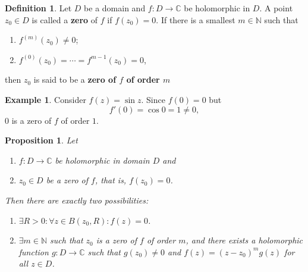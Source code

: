 \documentclass[12pt,openany]{book}
\newtheorem{proposition}[theorem]{Proposition}
\theoremstyle{definition}
\newtheorem{definition}{Definition}[chapter]
\newtheorem{example}{Example}[section]
\newcommand{\N}{\mathbb{N}}
\newcommand{\C}{\mathbb{C}}
\begin{document}
	\vspace{8pt}
	\begin{tcolorbox}[colback=white,colframe=defcolor,arc=5pt,title={\color{white}\bf Zero}]
		\begin{definition}
			Let $D$ be a domain and $f:D\to\C$ be holomorphic in $D$. A point $z_0\in D$ is called a \textbf{zero} of $f$ if $f(z_0)=0$. If there is a smallest $m\in\N$ such that \begin{enumerate}[(1)]
				\item $f^{(m)}(z_0)\neq 0$;
				\item $f^{(0)}(z_0)=\cdots=f^{m-1}(z_0)=0$,
			\end{enumerate} then $z_0$ is said to be a \textbf{zero of $f$ of order $m$}
		\end{definition}
	\end{tcolorbox}
	\begin{example}
		Consider $f(z)=\sin z$. Since $f(0)=0$ but \[
		f'(0)=\cos 0=1\neq 0,
		\] $0$ is a zero of $f$ of order $1$.
	\end{example}	
	\vspace{8pt}
	\begin{tcolorbox}[colback=white,colframe=procolor,arc=5pt,title={\color{white}\bf Classification of Zeros}]
		\begin{proposition}
			Let \begin{enumerate}[(1)]
				\item $f:D\to\C$ be holomorphic in domain $D$ and
				\item $z_0\in D$ be a zero of $f$, that is, $f(z_0)=0$. 
			\end{enumerate} Then there are exactly two possibilities: \begin{enumerate}
				\item $\exists R>0:\forall z \in B(z_0, R): f(z)=0$.
				\item $\exists m\in\N$ such that $z_0$ is a zero of $f$ of order $m$, and there exists a holomorphic function $g:D\to\C$ such that $g(z_0)\neq 0$ and $f(z)=(z-z_0)^mg(z)$ for all $z\in D$.
			\end{enumerate}
		\end{proposition}
	\end{tcolorbox}
\end{document}
